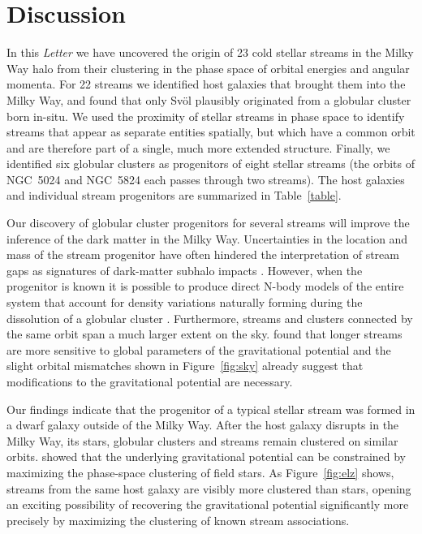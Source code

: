 \documentclass[twocolumn]{aastex63}
\begin{document}

\section{Discussion}
\label{sec:discussion}

In this {\it Letter} we have uncovered the origin of 23 cold stellar streams in the Milky Way halo from their clustering in the phase space of orbital energies and angular momenta.
For 22 streams we identified host galaxies that brought them into the Milky Way, and found that only Sv\" ol plausibly originated from a globular cluster born in-situ.
We used the proximity of stellar streams in phase space to identify streams that appear as separate entities spatially, but which have a common orbit and are therefore part of a single, much more extended structure.
Finally, we identified six globular clusters as progenitors of eight stellar streams (the orbits of NGC~5024 and NGC~5824 each passes through two streams).
The host galaxies and individual stream progenitors are summarized in Table~\ref{table}.

Our discovery of globular cluster progenitors for several streams will improve the inference of the dark matter in the Milky Way.
Uncertainties in the location and mass of the stream progenitor have often hindered the interpretation of stream gaps as signatures of dark-matter subhalo impacts \citep{banik2019}.
However, when the progenitor is known it is possible to produce direct N-body models of the entire system that account for density variations naturally forming during the dissolution of a globular cluster \citep[e.g.,][]{kuepper2015}.
Furthermore, streams and clusters connected by the same orbit span a much larger extent on the sky.
\citet{bh2018} found that longer streams are more sensitive to global parameters of the gravitational potential and the slight orbital mismatches shown in Figure~\ref{fig:sky} already suggest that modifications to the gravitational potential are necessary.

Our findings indicate that the progenitor of a typical stellar stream was formed in a dwarf galaxy outside of the Milky Way.
After the host galaxy disrupts in the Milky Way, its stars, globular clusters and streams remain clustered on similar orbits.
\citet{sanderson2015} showed that the underlying gravitational potential can be constrained by maximizing the phase-space clustering of field stars.
As Figure~\ref{fig:elz} shows, streams from the same host galaxy are visibly more clustered than stars, opening an exciting possibility of recovering the gravitational potential significantly more precisely by maximizing the clustering of known stream associations.
\end{document}
